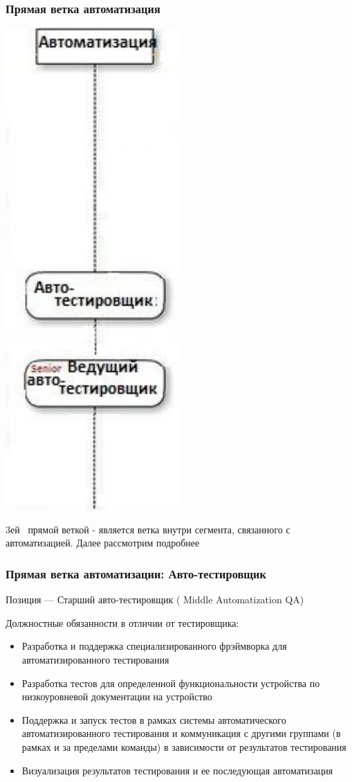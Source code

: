 \documentclass{../industrial-development}
\begin{document}
{\begin{frame} \frametitle{Прямая ветка автоматизация }
  \centerline{\includegraphics[width=0.27\linewidth]{11-IT-specialist's-way/sch11c.pdf}}
\end{frame}

\lecturenotes
 3ей~\cite{mc} прямой веткой  - является ветка внутри сегмента, связанного с автоматизацией. Далее рассмотрим подробнее

\begin{frame} \frametitle{Прямая ветка автоматизации: Авто-тестировщик }
 \begin{block}{}
  \alert{Позиция --- Старший авто-тестировщик ( Middle Automatization QA)}

Должностные обязанности в отличии от тестировщика: 
  \end{block}
  \begin{itemize}
  \item Разработка и поддержка специализированного фрэймворка для автоматизированного тестирования
  \item  Разработка тестов для определенной функциональности устройства по низкоуровневой документации на устройство
  \item Поддержка и запуск тестов в рамках системы автоматического автоматизированного тестирования и коммуникация с другими группами (в рамках и за пределами команды) в зависимости от результатов тестирования
 \item  Визуализация результатов тестирования и ее последующая автоматизация
  \end{itemize}
\end{frame}

}
\end{document}
